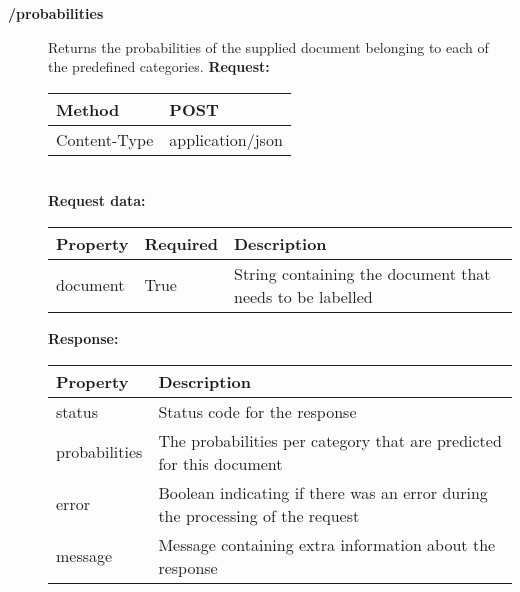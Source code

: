 \begin{description}
\item[\textbf{/probabilities}]
Returns the probabilities of the supplied document belonging to each of the predefined categories. 
\newline
\newline
\textbf{Request:}
\newline
\newline
\begin{tabular}{ | l | l |}
\hline
Method & POST\\ \hline
Content-Type & application/json\\ \hline
\end{tabular}
\\
\textbf{Request data:}\\
\begin{tabular}{ | l | l | l |}
\hline
\textbf{Property} & \textbf{Required} & \textbf{Description}\\ \hline
document & True & String containing the document that needs to be labelled\\ \hline
\end{tabular}
\newline
\newline
\textbf{Response:}
\newline
\newline
\begin{tabular}{ | l | l |}
\hline
\textbf{Property} & \textbf{Description}\\ \hline
status & Status code for the response\\ \hline
probabilities & The probabilities per category that are predicted for this document\\ \hline
error & Boolean indicating if there was an error during the processing of the request\\ \hline
message & Message containing extra information about the response\\ \hline
\end{tabular}
\end{description}